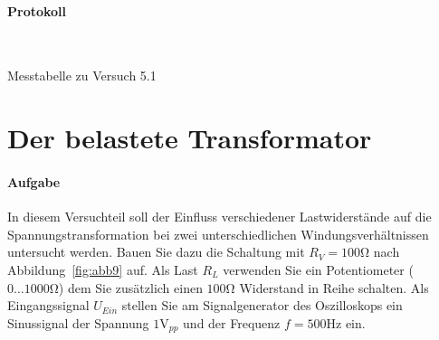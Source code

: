 \documentclass[10pt]{scrreprt}
\begin{document}
        \paragraph{Protokoll}
        $ $
        \begin{table}[h!]
            \begin{center}
                \caption{Messtabelle zu Versuch 5.1}
                \label{tab:mess1}
            \end{center}
        \end{table}


        \section{Der belastete Transformator}
        \paragraph{Aufgabe}
        In diesem Versuchteil soll der Einfluss verschiedener Lastwiderstände auf die
        Spannungstransformation bei zwei unterschiedlichen Windungsverhältnissen untersucht werden.
        Bauen Sie dazu die Schaltung mit $R_V = 100\si{\ohm}$ nach Abbildung~\ref{fig:abb9} auf. Als Last $R_L$ verwenden Sie ein
        Potentiometer ($0\ldots1000\si{\ohm}$) dem Sie zusätzlich einen $100\si{\ohm}$ Widerstand in Reihe schalten.
        Als Eingangssignal $U_{Ein}$ stellen Sie am Signalgenerator des Oszilloskops ein Sinussignal
        der Spannung $1 \si{\volt}_{pp}$ und der Frequenz $f = 500\si{\hertz}$ ein.
\end{document}
